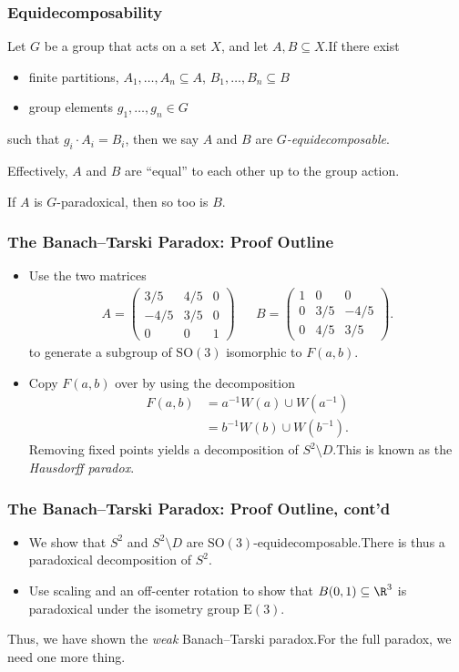 \documentclass{beamer-custom}
\begin{document}
\begin{frame}
  \frametitle{Equidecomposability}
  Let $G$ be a group that acts on a set $X$, and let $A,B\subseteq X$.\pause\:If there exist
  \begin{itemize}
    \item finite partitions, $A_1,\dots,A_n\subseteq A$, $B_1,\dots,B_n\subseteq B$
    \item group elements $g_1,\dots,g_n\in G$
  \end{itemize}
  such that $g_i\cdot A_i = B_i$, then we say $A$ and $B$ are \textit{$G$-equidecomposable}.\pause\newline

  Effectively, $A$ and $B$ are ``equal'' to each other up to the group action.\pause\newline

  If $A$ is $G$-paradoxical, then so too is $B$.
\end{frame}
\begin{frame}
  \frametitle{The Banach--Tarski Paradox: Proof Outline}
  \small
  \begin{itemize}
    \item Use the two matrices
      \begin{align*}
        A = \begin{pmatrix}3/5 & 4/5 & 0 \\  -4/5 & 3/5 & 0 \\ 0 & 0 & 1\end{pmatrix}
                               && B = \begin{pmatrix}1 & 0 & 0 \\ 0 & 3/5 & -4/5 \\ 0 & 4/5 & 3/5\end{pmatrix}.
      \end{align*}
      to generate a subgroup of $\text{SO}\left( 3 \right)$ isomorphic to $F(a,b)$.\pause
    \item Copy $F(a,b)$ over by using the decomposition
      \begin{align*}
        F(a,b) &= a^{-1}W\left( a \right)\cup W\left( a^{-1} \right)\\
                &= b^{-1}W\left( b \right) \cup W\left( b^{-1} \right).
      \end{align*}\pause
      Removing fixed points yields a decomposition of $S^{2}\setminus D$.\:This is known as the \textit{Hausdorff paradox}.
  \end{itemize}
\end{frame}
\begin{frame}
  \frametitle{The Banach--Tarski Paradox: Proof Outline, cont'd}
  \begin{itemize}
    \item We show that $S^{2}$ and $S^{2}\setminus D$ are $\text{SO}(3)$-equidecomposable.\pause\:There is thus a paradoxical decomposition of $S^{2}$.\pause
    \item Use scaling and an off-center rotation to show that $B(0,1)\subseteq \R^3$ is paradoxical under the isometry group $\text{E}(3)$.\pause
  \end{itemize}
  Thus, we have shown the \textit{weak} Banach--Tarski paradox.\pause\:For the full paradox, we need one more thing.
\end{frame}
\end{document}
